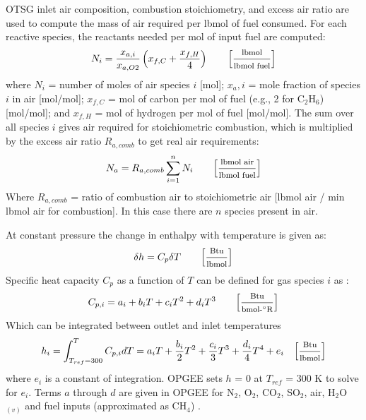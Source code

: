 \documentclass[11pt]{report}
\newcommand{\marg}[1]{{\footnotesize\textit{\textcolor{stanford}{'#1'}}}}
\newcommand{\marginnote}[1]{\marginpar{\marg{#1}}}
\begin{document}
OTSG inlet air composition, combustion stoichiometry, and excess air ratio are used to compute the mass of air required per lbmol of fuel consumed. For each reactive species, the reactants needed per mol of input fuel are computed: \marginnote{Fuel \\ Specs \\ Table 2.3}
\begin{equation}\label{eq:steam_N_stoich_comb}
N_i = \frac{x_{a,i}}{x_{a,O2}}\left({x_{f,C} +\frac{x_{f,H}}{4}}\right) \quad\quad \footnotesize{\left[\frac{\text{lbmol}}{\text{lbmol fuel}}\right]}
\end{equation}
where $N_i$ = number of moles of air species $i$ [mol]; $x_a,i$ = mole fraction of species $i$ in air [mol/mol]; $x_{f,C}$ = mol of carbon per mol of fuel (e.g., 2 for C$_2$H$_6$) [mol/mol]; and $x_{f,H}$ = mol of hydrogen per mol of fuel [mol/mol]. The sum over all species $i$ gives air required for stoichiometric combustion, which is multiplied by the excess air ratio $R_{a,comb}$ to get real air requirements:
\marginnote{Steam Generation 2.2.3}
\begin{equation}\label{eq:steam_N_real_comb}
N_{a} = R_{a,comb}\sum_{i=1}^{n} N_i \quad\quad \footnotesize{\left[\frac{\text{lbmol air}}{\text{lbmol fuel}}\right]} 
\end{equation}
Where $R_{a,comb}$ = ratio of combustion air to stoichiometric air [lbmol air / min lbmol air for combustion]. In this case there are $n$ species present in air.

At constant pressure the change in enthalpy with temperature is given as:
\begin{equation}\label{eq:steam_dh}
\delta h = C_p \delta T \quad\quad \footnotesize{\left[\frac{\text{Btu}}{\text{lbmol}}\right]}
\end{equation}
Specific heat capacity $C_p$ as a function of $T$ can be defined for gas species $i$ as \cite[Table A-2E]{Cengel2006}:
\begin{equation}\label{eq:steam_cp}
C_{p,i}= a_i+b_iT + c_iT^2 + d_iT^3 \quad\quad \footnotesize{\left[\frac{\text{Btu}}{\text{bmol-$^\circ$R}}\right]} 
\end{equation}
Which can be integrated between outlet and inlet temperatures
\begin{equation}\label{eq:steam_hx}
h_i = \int_{T_{ref}=300}^{T} C_{p,i} dT = a_iT+\frac{b_i}{2}T^2 + \frac{c_i}{3}T^3 + \frac{d_i}{4}T^4 + e_i \quad \footnotesize{\left[\frac{\text{Btu}}{\text{lbmol}}\right]} 
\end{equation}
where $e_i$ is a constant of integration. OPGEE sets $h$ = 0 at $T_{ref}$ = 300 K to solve for $e_i$. Terms $a$ through $d$ are given in OPGEE for N$_2$, O$_2$, CO$_2$, SO$_2$, air, H$_2$O$_{(v)}$ and fuel inputs (approximated as CH$_4$) \cite{Cengel2006}. \marginnote{Steam Generation 2.2.4}
\end{document}
